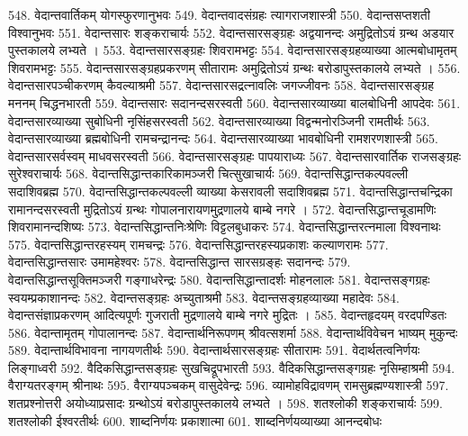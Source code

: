 548. वेदान्तवार्तिकम् 						योगस्फुरणानुभवः
549. वेदान्तवादसंग्रहः						त्यागराजशास्त्री
550. वेदान्तसप्तशती							विश्वानुभवः
551. वेदान्तसारः							शङ्कराचार्यः
552. वेदान्तसारसङ्ग्रहः 					अद्वयानन्दः
		अमुद्रितोऽयं ग्रन्थ अडयार पुस्तकालये लभ्यते ।
553. वेदान्तसारसङ्ग्रहः					शिवरामभट्टः
554. वेदान्तसारसङ्ग्रहव्याख्या आत्मबोधामृतम् शिवरामभट्टः 
555. वेदान्तसारसङ्ग्रहप्रकरणम्			सीतारामः
		अमुद्रितोऽयं ग्रन्थः बरोडापुस्तकालये लभ्यते ।
556. वेदान्तसारपञ्चीकरणम् 				कैवल्याश्रमी
557. वेदान्तसारसद्रत्नावलिः 				जगज्जीवनः
558. वेदान्तसारसङ्ग्रह मननम् 			चिद्धनभारती 
559. वेदान्तसारः							सदानन्दसरस्वती
560. वेदान्तसारव्याख्या बालबोधिनी		आपदेवः 
561. वेदान्तसारव्याख्या सुबोधिनी			नृसिंहसरस्वती 
562. वेदान्तसारव्याख्या विद्वन्मनोरञ्जिनी	रामतीर्थः
563. वेदान्तसारव्याख्या ब्रह्मबोधिनी		रामचन्द्रानन्दः
564. वेदान्तसारव्याख्या भावबोधिनी		रामशरणशास्त्री
565. वेदान्तसारसर्वस्वम् 					माधवसरस्वती
566. वेदान्तसारसङ्ग्रहः					पापयाराध्यः
567. वेदान्तसारवार्तिक राजसङ्ग्रहः		सुरेश्वराचार्यः
568. वेदान्तसिद्धान्तकारिकामञ्जरी			चित्सुखाचार्यः
569. वेदान्तसिद्धान्तकल्पवल्ली				सदाशिवब्रह्म
570. वेदान्तसिद्धान्तकल्पवल्ली व्याख्या केसरावली सदाशिवब्रह्म
571. वेदान्तसिद्धान्तचन्द्रिका 				रामानन्दसरस्वती
		मुद्रितोऽयं ग्रन्थः गोपालनारायणमु्द्रणालये बाम्बे नगरे । 
572. वेदान्तसिद्धान्तचूडामणिः				शिवरामानन्दशिष्यः
573. वेदान्तसिद्धान्तनिःश्रेणिः				विट्टलबुधाकरः
574. वेदान्तसिद्धान्तरत्नमाला 				विश्वनाथः 
575. वेदान्तसिद्धान्तरहस्यम् 				रामचन्द्रः
576. वेदान्तसिद्धान्तरहस्यप्रकाशः			कल्याणरामः
577. वेदान्तसिद्धान्तसारः					उमामहेश्वरः
578. वेदान्तसिद्धान्त सारसग्रङ्हः			सदानन्दः
579. वेदान्तसिद्धान्तसूक्तिमञ्जरी			गङ्गाधरेन्द्रः
580. वेदान्तसिद्धान्तादर्शः 					मोहनलालः
581. वेदान्तसङ्गग्रहः							स्वयम्प्रकाशानन्दः
582. वेदान्तसङ्ग्रहः						अच्युताश्रमी
583. वेदान्तसङ्ग्रहव्याख्या					महादेवः
584. वेदान्तसंज्ञाप्रकरणम् 					आदित्यपूर्णः
		गुजराती मुद्रणालये बाम्बे नगरे मुद्रितः । 
585. वेदान्तहृदयम् 							वरदपण्डितः
586. वेदान्तामृतम् 							गोपालानन्दः
587. वेदान्तार्थनिरूपणम् 					श्रीवत्सशर्मा
588. वेदान्तार्थविवेचन भाष्यम् 				मुकुन्दः 
589. वेदान्तार्थविभावना						नागयणतीर्थः
590. वेदान्तार्थसारसङ्ग्रहः					सीतारामः
591. वेदार्थतत्वनिर्णयः						लिङ्गाध्वरी
592. वैदिकसिद्धान्तसङ्ग्रहः				सुखचिद्रूपभारती
593. वैदिकसिद्धान्तसङ्गग्रहः				नृसिम्हाश्रमी
594. वैराग्यतरङ्गम् 							श्रीनाथः
595. वैराग्यपञ्चकम् 							वासुदेवेन्द्रः
596. व्यामोहविद्रावणम्						रामसुब्रह्मण्यशास्त्री
597. शतप्रश्नोत्तरी							अयोध्याप्रसादः
		ग्रन्थोऽयं बरोडापुस्तकालये लभ्यते । 
598. शतश्लोकी 							शङ्कराचार्यः
599. शतश्लोकी								ईश्वरतीर्थः
600. शाब्दनिर्णयः							प्रकाशात्मा
601.	शाब्दनिर्णयव्याख्या					आनन्दबोधः
